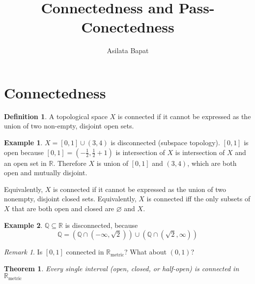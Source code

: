 \documentclass[12pt]{amsart}
\title[Connectedness]
	{Connectedness and Pass-Conectedness}
\author{Asilata Bapat}
\newcommand{\bbR}{\mathbb{R}}
\newcommand{\bbQ}{\mathbb{Q}}
\theoremstyle{plain}
\newtheorem*{thm}{Theorem}
\theoremstyle{remark}
\newtheorem*{rmk}{Remark}
\theoremstyle{definition}
\newtheorem*{define}{Definition}
\newtheorem*{eg}{Example}
\begin{document}
\maketitle
{}

\section*{Connectedness}
\begin{define}
	A topological space $X$ is connected if it cannot be expressed as the union of two non-empty, disjoint open sets.
\end{define}
\begin{eg}
	$X = [0, 1] \cup (3,4)$ is disconnected (subspace topology).
	\newline
	$[0,1]$ is open because $[0, 1] = (-\frac{1}{2}, \frac{1}{2} + 1)$ is intersection of $X$ is intersection of $X$ and an open set in $\bbR$. Therefore $X$ is union of $[0,1]$ and $(3,4)$, which are both open and mutually disjoint.
\end{eg}

Equivalently, $X$ is connected if it cannot be expressed as the union of two nonempty, disjoint closed sets. Equivalently, $X$ is connected iff the only subsets of $X$ that are both open and closed are $\varnothing$ and $X$.

\begin{eg}
	$\bbQ \subseteq \bbR$ is disconnected, because 
	\begin{equation*}
		\bbQ = (\bbQ \cap (-\infty, \sqrt{2})) \cup (\bbQ \cap (\sqrt{2}, \infty))
	\end{equation*}
\end{eg}

\begin{rmk}
	Is $[0, 1]$ connected in $\bbR_{\text{metric}}$? What about $(0, 1)$?
\end{rmk}

\begin{thm}
	Every single interval (open, closed, or half-open) is connected in $\bbR_{\text{metric}}$
\end{thm}
\end{document}
